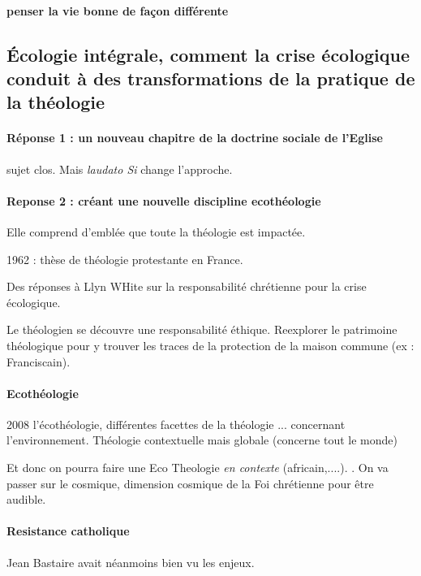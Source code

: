 \paragraph{penser la vie bonne de façon différente}

\subsection{Écologie intégrale, comment la crise écologique conduit à des transformations de la pratique de la théologie}


\paragraph{Réponse 1 : un nouveau chapitre de la doctrine sociale de l'Eglise} sujet clos. Mais \textit{laudato Si} change l'approche.

\paragraph{Reponse 2 : créant une nouvelle discipline ecothéologie} Elle comprend d'emblée que toute la théologie est impactée.

1962 : thèse de théologie protestante en France. 

Des réponses à Llyn WHite sur la responsabilité chrétienne pour la crise écologique.

Le théologien se découvre une responsabilité éthique. Reexplorer le patrimoine théologique pour y trouver les traces de la protection de la maison commune (ex : Franciscain).

\paragraph{Ecothéologie}
\begin{Def}
 2008 l'écothéologie, différentes facettes de la théologie ... concernant l'environnement. Théologie contextuelle mais globale (concerne tout le monde)
\end{Def}
Et donc on pourra faire une Eco Theologie \textit{en contexte} (africain,....). . On va passer sur le cosmique, dimension cosmique de la Foi chrétienne pour être audible.

\paragraph{Resistance catholique} Jean Bastaire avait néanmoins bien vu les enjeux.


